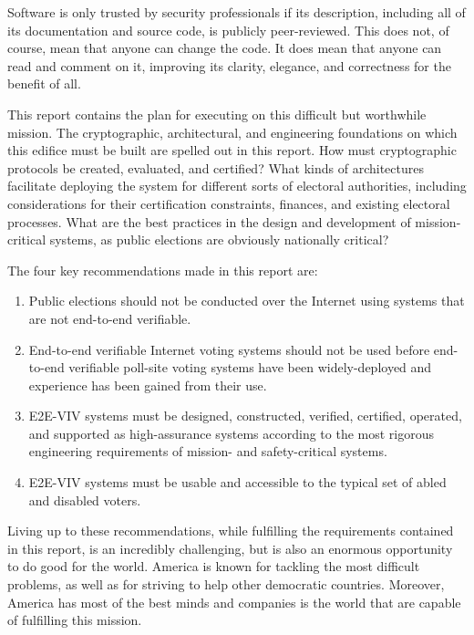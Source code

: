 Software is only trusted by security professionals if its description,
including all of its documentation and source code, is publicly
peer-reviewed.  This does not, of course, mean that anyone can change
the code.  It does mean that anyone can read and comment on it,
improving its clarity, elegance, and correctness for the benefit of
all.

This report contains the plan for executing on this difficult but
worthwhile mission.  The cryptographic, architectural, and engineering
foundations on which this edifice must be built are spelled out in
this report.  How must cryptographic protocols be created, evaluated,
and certified?  What kinds of architectures facilitate deploying the
system for different sorts of electoral authorities, including
considerations for their certification constraints, finances, and
existing electoral processes.  What are the best practices in the
design and development of mission-critical systems, as public
elections are obviously nationally critical?

The four key recommendations made in this report are:
\begin{enumerate}
\item Public elections should not be conducted over the Internet using
  systems that are not end-to-end verifiable.

\item  End-to-end verifiable Internet voting systems should not be used
  before end-to-end verifiable poll-site voting systems have been
  widely-deployed and experience has been gained from their use.

\item  E2E-VIV systems must be designed, constructed, verified, certified,
  operated, and supported as high-assurance systems according to the
  most rigorous engineering requirements of mission- and
  safety-critical systems.

\item  E2E-VIV systems must be usable and accessible to the typical set of
  abled and disabled voters.
\end{enumerate}

Living up to these recommendations, while fulfilling the requirements
contained in this report, is an incredibly challenging, but is also an
enormous opportunity to do good for the world.  America is known for
tackling the most difficult problems, as well as for striving to help
other democratic countries.  Moreover, America has most of the best
minds and companies is the world that are capable of fulfilling this
mission.

